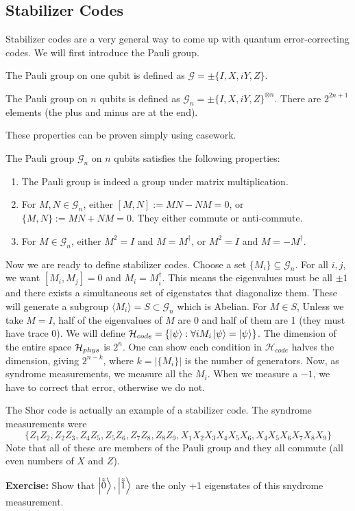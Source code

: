 \subsection{Stabilizer Codes}
Stabilizer codes are a very general way to come up with quantum error-correcting codes. We will first introduce the Pauli group.
\begin{definition}
    The Pauli group on one qubit is defined as $\mathcal{G}= \pm \{I, X, iY, Z\}$.

    The Pauli group on $n$ qubits is defined as $\mathcal{G}_n = \pm \{I, X, iY, Z\}^{\otimes n}$. There are $2^{2n + 1}$ elements (the plus and minus are at the end).
\end{definition}
These properties can be proven simply using casework.
\begin{theorem}
    The Pauli group $\mathcal{G}_n$ on $n$ qubits satisfies the following properties:
    \begin{enumerate}
    \item The Pauli group is indeed a group under matrix multiplication.
    \item For $M, N \in \mathcal{G}_n$, either $[M, N] := MN - NM = 0$,
    or $\{M, N\} := MN + NM = 0$. They either commute or anti-commute.
    \item For $M \in \mathcal{G}_n$, either $M^2 = I$ and $M = M^{\dagger}$, or $M^2 = I$ and $M = -M^{\dagger}$.
    \end{enumerate}
\end{theorem}
Now we are ready to define stabilizer codes. Choose a set $\{ M_i \} \subseteq \mathcal{G}_n$. For all $i, j$,
we want $[M_i, M_j] = 0$ and $M_i = M_i^{\dagger}$. This means the eigenvalues must be all $\pm 1$ and
there exists a simultaneous set of eigenstates that diagonalize them. These will generate a subgroup $\langle M_i \rangle = S \subset \mathcal{G}_n$
which is Abelian. For $M \in S$, Unless we take $M = I$, half of the eigenvalues of $M$ are 0 and half of them are 1 (they must have trace 0).
We will define $\operatorname{\mathcal{H}}_{code} = \{ \ket{\psi} : \forall i M_i \ket{\psi} = \ket{\psi} \}$. The dimension of the
entire space $\operatorname{\mathcal{H}}_{phys}$ is $2^n$. One can show each condition in $\mathcal{H}_{code}$ halves the dimension, giving
$2^{n - k}$, where $k = |\{M_i\}|$ is the number of generators. Now, as syndrome measurements,
we measure all the $M_i$. When we measure a $-1$, we have to correct that error, otherwise we do not.
\begin{example}
    The Shor code is actually an example of a stabilizer code. The syndrome measurements were 
    \[ \{ Z_1 Z_2, Z_2 Z_3, Z_4 Z_5, Z_5 Z_6, Z_7 Z_8, Z_8 Z_9, X_1 X_2 X_3 X_4 X_5 X_6, X_4 X_5 X_6 X_7 X_8 X_9 \}\]
    Note that all of these are members of the Pauli group and they all commute (all even numbers of $X$ and $Z$).

    \textbf{Exercise:} Show that $\ket{\tilde{\tilde{0}}}, \ket{\tilde{\tilde{1}}}$ are the only +1 eigenstates of this snydrome measurement.
\end{example}
